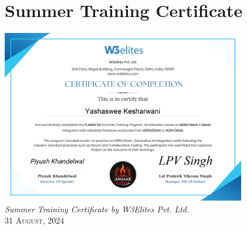 \section{Summer Training Certificate}
    \begin{center}
    \vspace{2.5cm}
    \includegraphics[width=0.8\textwidth]{assets/certificate.png}\\
    \vspace{1.5cm}
    \large
    \textit{Summer Training Certificate by W3Elites Pvt. Ltd.\\}
    \textsc{31 August, 2024}
    \end{center}
